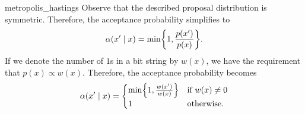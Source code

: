 \begin{solution}{metropolis_hastings}
  Observe that the described proposal distribution is symmetric.
  Therefore, the acceptance probability simplifies to \begin{align*}
    \alpha(x' \mid x) = \min\braces*{1, \frac{p(x')}{p(x)}}.
  \end{align*}
  If we denote the number of $1$s in a bit string by $w(x)$, we have the requirement that $p(x) \propto w(x)$.
  Therefore, the acceptance probability becomes \begin{align*}
    \alpha(x' \mid x) = \begin{cases}
      \min\braces*{1, \frac{w(x')}{w(x)}} & \text{if $w(x) \neq 0$} \\
      1 & \text{otherwise}.
    \end{cases}
  \end{align*}
\end{solution}

